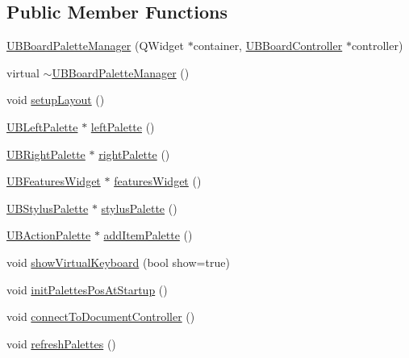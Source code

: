 \subsection*{Public Member Functions}
\begin{DoxyCompactItemize}
\item 
\hyperlink{class_u_b_board_palette_manager_ab2ca22bf5af16f59e273a72731a138ae}{U\-B\-Board\-Palette\-Manager} (Q\-Widget $\ast$container, \hyperlink{class_u_b_board_controller}{U\-B\-Board\-Controller} $\ast$controller)
\item 
virtual \hyperlink{class_u_b_board_palette_manager_ab51f4aedd5e620d5ca112c408565efdb}{$\sim$\-U\-B\-Board\-Palette\-Manager} ()
\item 
void \hyperlink{class_u_b_board_palette_manager_a04b4a969c6ee900494c45adb18ed3880}{setup\-Layout} ()
\item 
\hyperlink{class_u_b_left_palette}{U\-B\-Left\-Palette} $\ast$ \hyperlink{class_u_b_board_palette_manager_a76b2e12caaf9376bd39885acd5f797b2}{left\-Palette} ()
\item 
\hyperlink{class_u_b_right_palette}{U\-B\-Right\-Palette} $\ast$ \hyperlink{class_u_b_board_palette_manager_a6d89a033f9869ffd5c66b54f7492c938}{right\-Palette} ()
\item 
\hyperlink{class_u_b_features_widget}{U\-B\-Features\-Widget} $\ast$ \hyperlink{class_u_b_board_palette_manager_aa4f173738cc75b31d7cee042b238e69b}{features\-Widget} ()
\item 
\hyperlink{class_u_b_stylus_palette}{U\-B\-Stylus\-Palette} $\ast$ \hyperlink{class_u_b_board_palette_manager_a58a06d7c12b7f84d42fb6fa72018532a}{stylus\-Palette} ()
\item 
\hyperlink{class_u_b_action_palette}{U\-B\-Action\-Palette} $\ast$ \hyperlink{class_u_b_board_palette_manager_ab9f251e00e0fd53f7b23ef0ac02c864e}{add\-Item\-Palette} ()
\item 
void \hyperlink{class_u_b_board_palette_manager_ae8dba03662fcca8a9d3db38ddade8b95}{show\-Virtual\-Keyboard} (bool show=true)
\item 
void \hyperlink{class_u_b_board_palette_manager_a9b80a4d08af2acd43818cbf343a4d8d7}{init\-Palettes\-Pos\-At\-Startup} ()
\item 
void \hyperlink{class_u_b_board_palette_manager_aa4ad780181b5a1259303f1ea54497613}{connect\-To\-Document\-Controller} ()
\item 
void \hyperlink{class_u_b_board_palette_manager_ad3496e7ff0dd51fb7b1342a20d9dd798}{refresh\-Palettes} ()
\item 

\end{DoxyCompactItemize}

